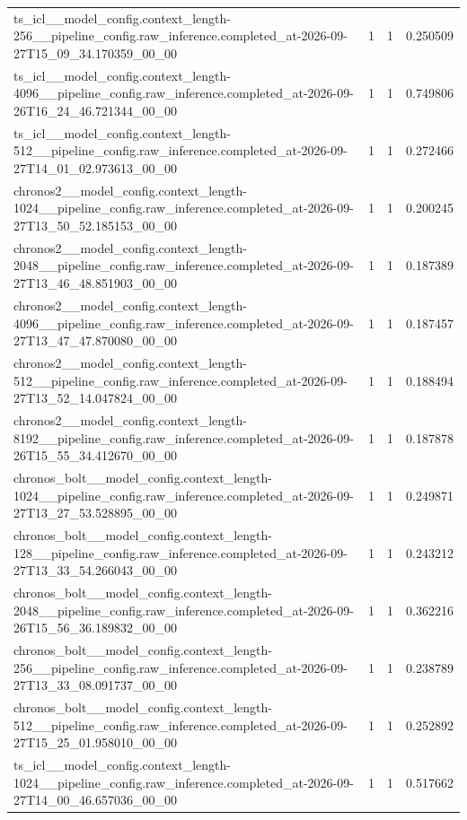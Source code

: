 \begin{tabular}{llll}
ts\_icl\_\_model\_config.context\_length-256\_\_pipeline\_config.raw\_inference.completed\_at-2026-09-27T15\_09\_34.170359\_00\_00 & 1 & 1 & 0.250509 \\
ts\_icl\_\_model\_config.context\_length-4096\_\_pipeline\_config.raw\_inference.completed\_at-2026-09-26T16\_24\_46.721344\_00\_00 & 1 & 1 & 0.749806 \\
ts\_icl\_\_model\_config.context\_length-512\_\_pipeline\_config.raw\_inference.completed\_at-2026-09-27T14\_01\_02.973613\_00\_00 & 1 & 1 & 0.272466 \\
chronos2\_\_model\_config.context\_length-1024\_\_pipeline\_config.raw\_inference.completed\_at-2026-09-27T13\_50\_52.185153\_00\_00 & 1 & 1 & 0.200245 \\
chronos2\_\_model\_config.context\_length-2048\_\_pipeline\_config.raw\_inference.completed\_at-2026-09-27T13\_46\_48.851903\_00\_00 & 1 & 1 & 0.187389 \\
chronos2\_\_model\_config.context\_length-4096\_\_pipeline\_config.raw\_inference.completed\_at-2026-09-27T13\_47\_47.870080\_00\_00 & 1 & 1 & 0.187457 \\
chronos2\_\_model\_config.context\_length-512\_\_pipeline\_config.raw\_inference.completed\_at-2026-09-27T13\_52\_14.047824\_00\_00 & 1 & 1 & 0.188494 \\
chronos2\_\_model\_config.context\_length-8192\_\_pipeline\_config.raw\_inference.completed\_at-2026-09-26T15\_55\_34.412670\_00\_00 & 1 & 1 & 0.187878 \\
chronos\_bolt\_\_model\_config.context\_length-1024\_\_pipeline\_config.raw\_inference.completed\_at-2026-09-27T13\_27\_53.528895\_00\_00 & 1 & 1 & 0.249871 \\
chronos\_bolt\_\_model\_config.context\_length-128\_\_pipeline\_config.raw\_inference.completed\_at-2026-09-27T13\_33\_54.266043\_00\_00 & 1 & 1 & 0.243212 \\
chronos\_bolt\_\_model\_config.context\_length-2048\_\_pipeline\_config.raw\_inference.completed\_at-2026-09-26T15\_56\_36.189832\_00\_00 & 1 & 1 & 0.362216 \\
chronos\_bolt\_\_model\_config.context\_length-256\_\_pipeline\_config.raw\_inference.completed\_at-2026-09-27T13\_33\_08.091737\_00\_00 & 1 & 1 & 0.238789 \\
chronos\_bolt\_\_model\_config.context\_length-512\_\_pipeline\_config.raw\_inference.completed\_at-2026-09-27T15\_25\_01.958010\_00\_00 & 1 & 1 & 0.252892 \\
ts\_icl\_\_model\_config.context\_length-1024\_\_pipeline\_config.raw\_inference.completed\_at-2026-09-27T14\_00\_46.657036\_00\_00 & 1 & 1 & 0.517662 \\

\end{tabular}
